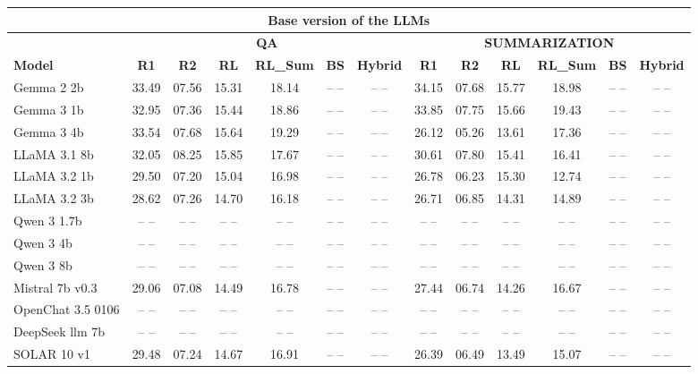 \begin{table}[ht]
\centering
\scriptsize
\begin{tabular}{lcccccc|cccccc}

\toprule
\multicolumn{13}{c}{\textbf{Base version of the LLMs}}  \\

\midrule
 & \multicolumn{6}{c|}{\textbf{QA}} & \multicolumn{6}{c}{\textbf{SUMMARIZATION}} \\
\midrule

\textbf{Model} & \textbf{R1} & \textbf{R2} & \textbf{RL} & \textbf{RL\_Sum} & \textbf{BS} & \textbf{Hybrid} & \textbf{R1} & \textbf{R2} & \textbf{RL} & \textbf{RL\_Sum} & \textbf{BS} & \textbf{Hybrid} \\
\midrule

Gemma 2 2b & 33.49 & 07.56 & 15.31 & 18.14 & -- -- & -- -- & 34.15 & 07.68 & 15.77 & 18.98 & -- -- & -- -- \\
Gemma 3 1b & 32.95 & 07.36 & 15.44 & 18.86 & -- -- & -- -- & 33.85 & 07.75 & 15.66 & 19.43 & -- -- & -- -- \\
Gemma 3 4b & 33.54 & 07.68 & 15.64 & 19.29 & -- -- & -- -- & 26.12 & 05.26 & 13.61 & 17.36 & -- -- & -- -- \\
LLaMA 3.1 8b & 32.05 & 08.25 & 15.85 & 17.67 & -- -- & -- -- & 30.61 & 07.80 & 15.41 & 16.41 & -- -- & -- -- \\
LLaMA 3.2 1b & 29.50 & 07.20 & 15.04 & 16.98 & -- -- & -- -- & 26.78 & 06.23 & 15.30 & 12.74 & -- -- & -- -- \\
LLaMA 3.2 3b & 28.62 & 07.26 & 14.70 & 16.18 & -- -- & -- -- & 26.71 & 06.85 & 14.31 & 14.89 & -- -- & -- -- \\
Qwen 3 1.7b & -- -- & -- -- & -- -- & -- -- & -- -- & -- -- & -- -- & -- -- & -- -- & -- -- & -- -- & -- -- \\
Qwen 3 4b & -- -- & -- -- & -- -- & -- -- & -- -- & -- -- & -- -- & -- -- & -- -- & -- -- & -- -- & -- -- \\
Qwen 3 8b & -- -- & -- -- & -- -- & -- -- & -- -- & -- -- & -- -- & -- -- & -- -- & -- -- & -- -- & -- -- \\
Mistral 7b v0.3 & 29.06 & 07.08 & 14.49 & 16.78 & -- -- & -- -- & 27.44 & 06.74 & 14.26 & 16.67 & -- -- & -- -- \\
OpenChat 3.5 0106 & -- -- & -- -- & -- -- & -- -- & -- -- & -- -- & -- -- & -- -- & -- -- & -- -- & -- -- & -- -- \\
DeepSeek llm 7b & -- -- & -- -- & -- -- & -- -- & -- -- & -- -- & -- -- & -- -- & -- -- & -- -- & -- -- & -- -- \\
SOLAR 10 v1 & 29.48 & 07.24 & 14.67 & 16.91 & -- -- & -- -- & 26.39 & 06.49 & 13.49 & 15.07 & -- -- & -- -- \\


\end{tabular}
\end{table}
